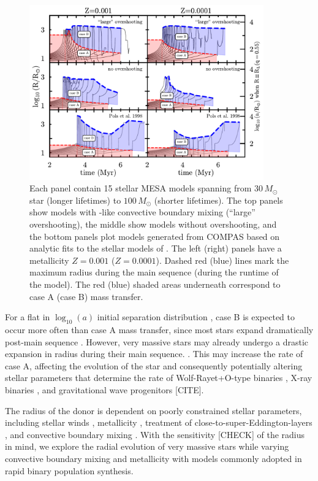 \documentclass[twocolumn]{aastex63}
\begin{document}
\begin{figure}[htbp]
  \centering
  \includegraphics[width=0.9\textwidth]{radii}
  \caption{Each panel contain 15 stellar \textsc{MESA} models spanning
    from $30 \, M_{\odot}$ star (longer lifetimes) to
    $100 \, M_{\odot}$ (shorter lifetimes). The top panels show
    models with \cite{brott:11}-like convective boundary mixing (``large'' overshooting), the
    middle show models without overshooting, and the bottom panels
    plot models generated from \textsc{COMPAS} based on analytic fits
    to the stellar models of \cite{pols:98}. The left (right) panels
    have a metallicity $Z=0.001$ ($Z=0.0001$). Dashed red (blue) lines
    mark the maximum radius during the main sequence (during the runtime of the model). The red (blue) shaded areas underneath correspond to
    case A (case B) mass transfer.}
  \label{fig:radii}
\end{figure}


For a flat in $\log_{10}(a)$ initial separation distribution
\citep{opik:24}, case B is expected to occur more often than case A
mass transfer, since most stars expand dramatically post-main sequence
\citep[e.g.,][]{vandenheuvel:69}. However, very massive stars may already
undergo a drastic expansion in radius during their main sequence.
\citep[e.g.,][]{sanyal:15, jiang:15}. This may increase
the rate of case A, affecting the evolution of the star and
consequently potentially altering stellar parameters that determine
the rate of Wolf-Rayet+O-type binaries \citep[e.g.,][]{nuijten:24},
X-ray binaries \citep[e.g.,][]{mandel:22}, and gravitational wave progenitors [CITE].

The radius of the donor is dependent on poorly constrained stellar
parameters, including stellar winds \citep{renzo:17, josiek:24},
metallicity \citep{xin:22}, treatment of
close-to-super-Eddington-layers \citep[e.g.,][]{joss:73, paxton:13,
  jiang:15, agrawal:22, jermyn:23}, and convective boundary mixing
\citep{anders:23, johnston:24}. With the sensitivity [CHECK] of the radius in
mind, we explore the radial evolution of very massive stars while
varying convective boundary mixing and metallicity with models
commonly adopted in rapid binary population synthesis.
\end{document}
